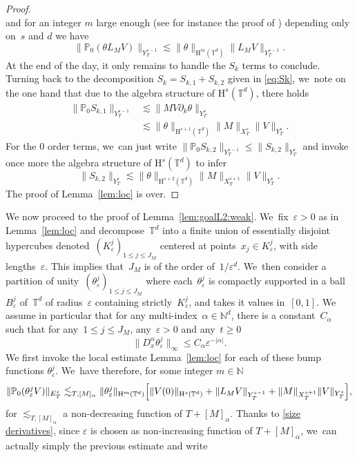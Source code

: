 \documentclass[10pt]{amsart}
\theoremstyle{definition}
\newcommand\N{\mathbb{N}}
\newcommand\T{\mathbb{T}}
\renewcommand\H{\mathrm{H}}
\let\ep\varepsilon
\begin{document}
\begin{proof}
\[\]
and for an integer $m$ large enough (see for instance the proof of \cite[Th.\,1.62]{BCD}) depending only on~$s$ and $d$ we have
\[
\|\mathbb{P}_0(\theta L_M V)\|_{Y_T^{s-1}} \lesssim \|\theta\|_{\H^{m}(\T^d)} \|L_M V\|_{Y_T^{s-1}}.
\]
At the end of the day, it only remains to handle the $S_k$ terms to conclude. Turning back to the decomposition $S_k = S_{k,1}+S_{k,2}$ given in \eqref{eq:Sk}, we~note on the one hand that due to the algebra structure of $\H^s(\T^d)$, there holds
\begin{align*}
\|\mathbb{P}_0S_{k,1}\|_{Y_T^{s-1}} &\lesssim \|MV \partial_k\theta\|_{Y_T^s} \\
&\lesssim \|\theta\|_{\H^{s+1}(\T^d)} \|M\|_{X_T^{s}} \|V\|_{Y_T^s}.
\end{align*}
For the $0$ order terms, we~can just write $\|\mathbb{P}_0S_{k,2}\|_{Y_T^{s-1}} \leq \|S_{k,2}\|_{Y_T^s}$ and invoke once more the algebra structure of $\H^s(\T^d)$ to infer
\[
\|S_{k,2}\|_{Y_T^s} \lesssim \|\theta\|_{\H^{s+2}(\T^d)}\|M\|_{X_T^{s+1}} \|V\|_{Y_T^s}.
\]
The proof of Lemma~\ref{lem:loc} is over.
\end{proof}
We now proceed to the proof of Lemma~\ref{lem:goalL2:weak}. We~fix~$\ep>0$ as in Lemma~\ref{lem:loc} and decompose~$\T^d $ into a finite union of essentially disjoint hypercubes denoted~$(K^{j}_\ep)_{1 \leq j \leq J_M} $ centered at points~$ x_j \in K^j_\ep $, with side lengths~$\ep$. This implies that~$J_M$ is of the order of~$1/\ep^d$. We~then consider a partition of unity~$(\theta^{j}_\ep)_{1 \leq j \leq J_M} $ where each~$\theta^{j}_\ep $ is compactly supported in a ball~$B^{j}_\ep$ of~$\T^d$ of radius~$\ep$ containing strictly~$K^j_\ep $, and takes it values in~$[0,1]$.
We assume in particular that for any multi-index~$\alpha \in \N^d$, there is a constant~$C_\alpha$ such that for any~$1 \leq j \leq J_M$, any~$\ep>0$ and any~$t \geq 0$
\begin{equation}\label{size derivatives}
\| D_x^\alpha\theta^{j}_\ep\|_{\infty } \leq C_\alpha{\ep^{-|\alpha|}}.
\end{equation}
We first invoke the local estimate Lemma~\ref{lem:loc} for each of these bump functions $\theta_{\ep}^j$. We~have therefore, for some integer $m\in\N$
\[
\| \mathbb{P}_0(\theta_\ep^j V)\|_{E_T^s} \lesssim_{T,[M]_\alpha} \|\theta_\ep^j \|_{\H^m(\T^d)} \Bigl[\|V(0)\|_{\H^s(\T^d)} + \|L_M V\|_{Y_T^{s-1}} + \|M\|_{X_T^{s+1}}\|V\|_{Y_T^s}\Bigr],
\]
for $\lesssim_{T,[M]_\alpha}$ a non-decreasing function of $T+[M]_\alpha$. Thanks to \eqref{size derivatives}, since $\ep$ is chosen as non-increasing function of $T+[M]_\alpha$, we~can actually simply the previous estimate and write
\end{document}
